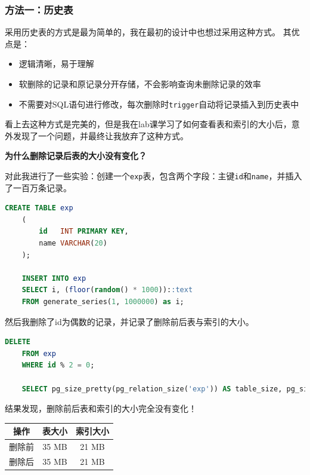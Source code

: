\documentclass[a4paper,10pt]{ctexart}
\begin{document}
\subsubsection{方法一：历史表}

采用历史表的方式是最为简单的，我在最初的设计中也想过采用这种方式。
其优点是：
\begin{itemize}
    \item 逻辑清晰，易于理解
    \item 软删除的记录和原记录分开存储，不会影响查询未删除记录的效率
    \item 不需要对SQL语句进行修改，每次删除时\texttt{trigger}自动将记录插入到历史表中
\end{itemize}

\vspace{0.7cm}
看上去这种方式是完美的，但是我在lab课学习了如何查看表和索引的大小后，意外发现了一个问题，并最终让我放弃了这种方式。

\begin{center}
    \textbf{为什么删除记录后表的大小没有变化？}
\end{center}

对此我进行了一些实验：创建一个\texttt{exp}表，包含两个字段：主键\texttt{id}和\texttt{name}，并插入了一百万条记录。

\begin{lstlisting}[language=SQL]
    CREATE TABLE exp
    (
        id   INT PRIMARY KEY,
        name VARCHAR(20)
    );
    
    INSERT INTO exp
    SELECT i, (floor(random() * 1000))::text
    FROM generate_series(1, 1000000) as i;
\end{lstlisting}

然后我删除了id为偶数的记录，并记录了删除前后表与索引的大小。

\begin{lstlisting}[language=SQL]
    DELETE
    FROM exp
    WHERE id % 2 = 0;
    
    SELECT pg_size_pretty(pg_relation_size('exp')) AS table_size, pg_size_pretty(pg_indexes_size('exp')) AS index_size;
\end{lstlisting}

结果发现，删除前后表和索引的大小完全没有变化！
\begin{center}
    \begin{tabular}{ccc}
        \toprule
        \textbf{操作} & \textbf{表大小} & \textbf{索引大小} \\
        \midrule
        删除前 & 35 MB & 21 MB \\
        删除后 & 35 MB & 21 MB \\
        \bottomrule
    \end{tabular}
\end{center}
\end{document}
